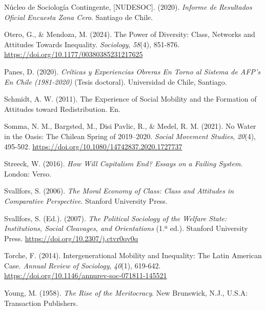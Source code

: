 \documentclass[
  spanish,
  letterpaper,
  DIV=11,
  numbers=noendperiod,
  oneside]{scrartcl}
\newlength{\cslhangindent}
\newenvironment{CSLReferences}[2] %
 {\begin{list}{}{%
  \setlength{\itemindent}{0pt}
  \setlength{\leftmargin}{0pt}
  \setlength{\parsep}{0pt}
  \ifodd #1
   \setlength{\leftmargin}{\cslhangindent}
   \setlength{\itemindent}{-1\cslhangindent}
  \fi
  \setlength{\itemsep}{#2\baselineskip}}}
 {\end{list}}
\begin{document}
\begin{CSLReferences}{1}{0}
Núcleo de Sociología Contingente, {[}NUDESOC{]}. (2020). \emph{Informe
de Resultados Oficial {Encuesta Zona Cero}}. Santiago de Chile.

Otero, G., \& Mendoza, M. (2024). The {Power} of {Diversity}: {Class},
{Networks} and {Attitudes Towards Inequality}. \emph{Sociology},
\emph{58}(4), 851-876. \url{https://doi.org/10.1177/00380385231217625}

Panes, D. (2020). \emph{Cr{í}ticas y Experiencias Obreras En Torno al
Sistema de {AFP}'s En {Chile} (1981-2020)} (Tesis doctoral). Universidad
de Chile, Santiago.

Schmidt, A. W. (2011). The Experience of Social Mobility and the
Formation of Attitudes toward Redistribution. En.

Somma, N. M., Bargsted, M., Disi Pavlic, R., \& Medel, R. M. (2021). No
Water in the Oasis: The {Chilean Spring} of 2019--2020. \emph{Social
Movement Studies}, \emph{20}(4), 495-502.
\url{https://doi.org/10.1080/14742837.2020.1727737}

Streeck, W. (2016). \emph{How Will Capitalism End? Essays on a Failing
System}. London: Verso.

Svallfors, S. (2006). \emph{The {Moral Economy} of {Class}: {Class} and
{Attitudes} in {Comparative Perspective}}. Stanford University Press.

Svallfors, S. (Ed.). (2007). \emph{The {Political Sociology} of the
{Welfare State}: {Institutions}, {Social Cleavages}, and {Orientations}}
(1.ª ed.). Stanford University Press.
\url{https://doi.org/10.2307/j.ctvr0qv0q}

Torche, F. (2014). Intergenerational {Mobility} and {Inequality}: {The
Latin American Case}. \emph{Annual Review of Sociology}, \emph{40}(1),
619-642. \url{https://doi.org/10.1146/annurev-soc-071811-145521}

Young, M. (1958). \emph{The Rise of the Meritocracy}. New Brunswick,
N.J., U.S.A: Transaction Publishers.

\end{CSLReferences}
\end{document}
